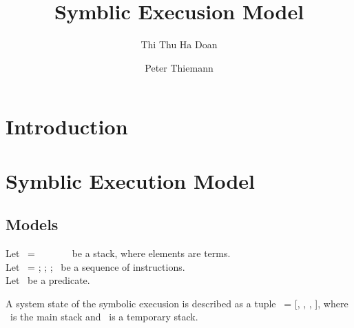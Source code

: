 \documentclass[runningheads]{llncs}
\begin{document}
%
\title{Symblic Execusion Model}
%
%
\author{Thi Thu Ha Doan\and
  Peter Thiemann}

%
%
%
\maketitle              %
%
\begin{abstract}
 

\keywords{}
\end{abstract}

%
%
%
\section{Introduction}
\label{sec:introduction}
\section{Symblic Execution Model}
\label{sec:symblic-execution-model}
\subsection{Models}
Let \STACK\ = \TermOne\ \STACKCONCAT\ \TermTwo\ \STACKCONCAT\ \DOT\ \STACKCONCAT\ \EMPTYSTACK\ be a stack, where elements are terms.
\\
Let \INSTRUCTION\ = \InstructionOne; \InstructionTwo; \DOT; \InstructionN\ be a sequence of instructions. 
\\
Let \PREDICATE\ be a predicate. 

\begin{definition}
A system state of the symbolic execusion is described as a tuple \STATE\ = [\INSTRUCTION, \STACK, \TSTACK, \PREDICATE], where \STACK\ is the main stack and \TSTACK\ is a temporary stack.
\end{definition}
\end{document}
